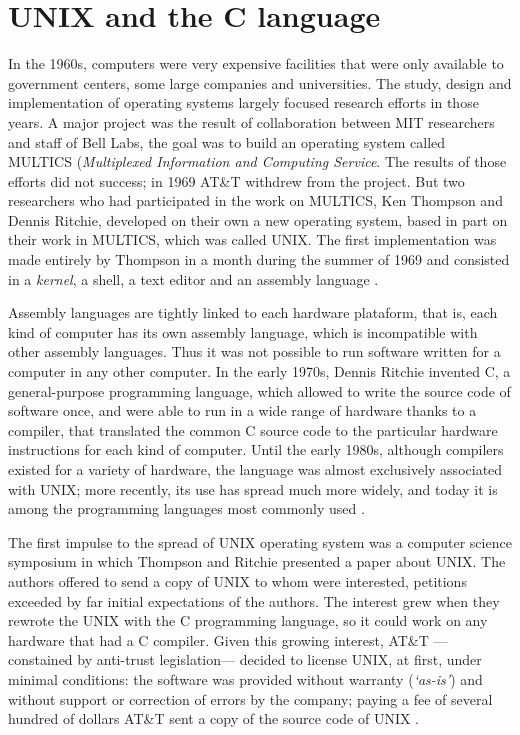 \section{UNIX and the C language}

In the 1960s, computers were very expensive facilities that were only available to government centers, some large companies and universities. The study, design and implementation of operating systems largely focused research efforts in those years. A major project was the result of collaboration between MIT researchers and staff of Bell Labs, the goal was to build an operating system called MULTICS (\emph{Multiplexed Information and Computing Service}. The results of those efforts did not success; in 1969 AT\&T withdrew from the project. But two researchers who had participated in the work on MULTICS, Ken Thompson and Dennis Ritchie, developed on their own a new operating system, based in part on their work in MULTICS, which was called UNIX. The first implementation was made entirely by Thompson in a month during the summer of 1969 and consisted in a \emph{kernel}, a shell, a text editor and an assembly language \citep[26]{weber:2004}.

Assembly languages are tightly linked to each hardware plataform, that is, each kind of computer has its own assembly language, which is incompatible with other assembly languages. Thus it was not possible to run software written for a computer in any other computer. In the early 1970s, Dennis Ritchie invented C, a general-purpose programming language, which allowed to write the source code of software once, and were able to run in a wide range of hardware thanks to a compiler, that translated the common C source code to the particular hardware instructions for each kind of computer. Until the early 1980s, although compilers existed for a variety of hardware, the language was almost exclusively associated with UNIX; more recently, its use has spread much more widely, and today it is among the programming languages most commonly used \citep{ritchie:1993}.

The first impulse to the spread of UNIX operating system was a computer science symposium in which Thompson and Ritchie presented a paper about UNIX. The authors offered to send a copy of UNIX to whom were interested, petitions exceeded by far initial expectations of the authors. The interest grew when they rewrote the UNIX with the C programming language, so it could work on any hardware that had a C compiler. Given this growing interest, AT\&T ---constained by anti-trust legislation--- decided to license UNIX, at first, under minimal conditions: the software was provided without warranty (\emph{`as-is'}) and without support or correction of errors by the company; paying a fee of several hundred of dollars AT\&T sent a copy of the source code of UNIX \citep[28-29]{weber:2004}.

